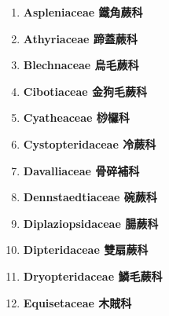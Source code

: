     \begin{enumerate}
      \item[] \begin{small}\textbf{Aspleniaceae 鐵角蕨科} \end{small}
        
      \item[] \begin{small}\textbf{Athyriaceae 蹄蓋蕨科} \end{small}
        
      \item[] \begin{small}\textbf{Blechnaceae 烏毛蕨科} \end{small}
        
      \item[] \begin{small}\textbf{Cibotiaceae 金狗毛蕨科} \end{small}
        
      \item[] \begin{small}\textbf{Cyatheaceae 桫欏科} \end{small}
        
      \item[] \begin{small}\textbf{Cystopteridaceae 冷蕨科} \end{small}
        
      \item[] \begin{small}\textbf{Davalliaceae 骨碎補科} \end{small}
        
      \item[] \begin{small}\textbf{Dennstaedtiaceae 碗蕨科} \end{small}
        
      \item[] \begin{small}\textbf{Diplaziopsidaceae 腸蕨科} \end{small}
        
      \item[] \begin{small}\textbf{Dipteridaceae 雙扇蕨科} \end{small}
        
      \item[] \begin{small}\textbf{Dryopteridaceae 鱗毛蕨科} \end{small}
        
      \item[] \begin{small}\textbf{Equisetaceae 木賊科} \end{small}

\end{enumerate}
